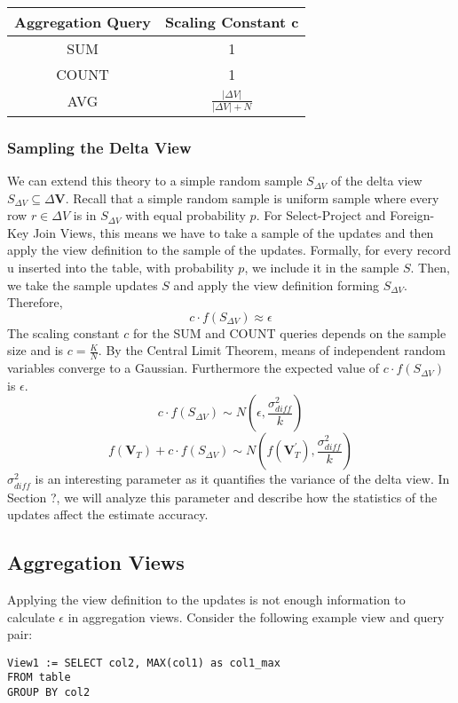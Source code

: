\begin{center}
\begin{tabular}{|c|c|}
\hline 
Aggregation Query & Scaling Constant c\tabularnewline
\hline 
\hline 
SUM & 1\tabularnewline
\hline 
COUNT & 1\tabularnewline
\hline 
AVG & $\frac{|\Delta V|}{|\Delta V|+N}$\tabularnewline
\hline 
\end{tabular}
\par\end{center}


\subsubsection{Sampling the Delta View}
We can extend this theory to a simple random sample $S_{\Delta V}$
of the delta view $S_{\Delta V}\subseteq\Delta\textbf{V}$. Recall
that a simple random sample is uniform sample where every row $r\in\Delta V$
is in $S_{\Delta V}$ with equal probability $p$. For Select-Project
and Foreign-Key Join Views, this means we have to take a sample of
the updates and then apply the view definition to the sample of the
updates. Formally, for every record u inserted into the table, with
probability $p$, we include it in the sample $S$. Then, we take
the sample updates $S$ and apply the view definition forming $S_{\Delta V}$.
Therefore,
\[
c\cdot f(S_{\Delta V})\approx\epsilon
\]
The scaling constant $c$ for the SUM and COUNT queries
depends on the sample size and is $c = \frac{K}{N}$.
By the Central Limit Theorem, means of independent random variables converge 
to a Gaussian. Furthermore the expected value of 
$c\cdot f(S_{\Delta V})$ is $\epsilon$. 
\[
c\cdot f(S_{\Delta V})\sim N(\epsilon,\frac{\sigma_{diff}^{2}}{k})
\]
\[
f(\textbf{V}_{T})+c\cdot f(S_{\Delta V})\sim N(f(\textbf{V}_{T}^{'}),\frac{\sigma_{diff}^{2}}{k})
\]
$\sigma_{diff}^{2}$ is an interesting parameter as it quantifies
the variance of the delta view. In Section ?, we will analyze this
parameter and describe how the statistics of the updates affect the
estimate accuracy.

\subsection{Aggregation Views}
Applying the view definition to the updates is not enough information
to calculate $\epsilon$ in aggregation views. Consider the following
example view and query pair:

\begin{lstlisting}
View1 := SELECT col2, MAX(col1) as col1_max
FROM table 
GROUP BY col2
\end{lstlisting}


